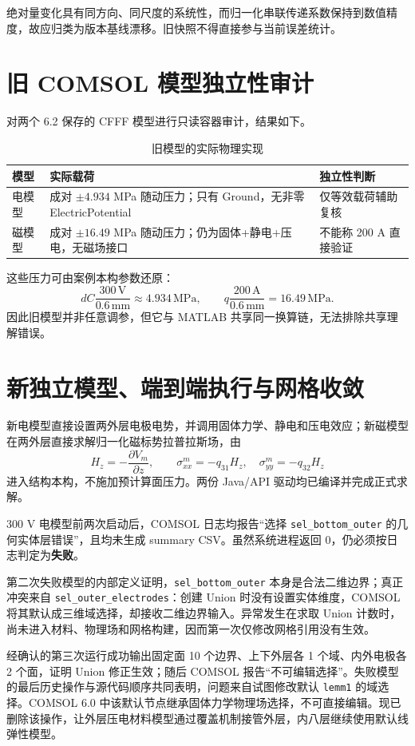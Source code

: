 \documentclass[UTF8,fontset=windows,11pt,a4paper]{ctexart}
\newcommand{\failure}{\textcolor{bad}{\textbf{失败}}}
\begin{document}
绝对量变化具有同方向、同尺度的系统性，而归一化串联传递系数保持到数值精度，故应归类为版本基线漂移。旧快照不得直接参与当前误差统计。

\section{旧 COMSOL 模型独立性审计}
对两个 6.2 保存的 CFFF 模型进行只读容器审计，结果如下。

\begin{table}[H]
\centering
\caption{旧模型的实际物理实现}
\small
\begin{tabularx}{\textwidth}{lXX}
\toprule
模型 & 实际载荷 & 独立性判断 \\
\midrule
电模型 & 成对 $\pm4.934$ MPa 随动压力；只有 Ground，无非零 ElectricPotential & 仅等效载荷辅助复核 \\
磁模型 & 成对 $\pm16.49$ MPa 随动压力；仍为固体+静电+压电，无磁场接口 & 不能称 200 A 直接验证 \\
\bottomrule
\end{tabularx}
\end{table}

这些压力可由案例本构参数还原：
\[
dC\frac{300\,\mathrm{V}}{0.6\,\mathrm{mm}}\approx4.934\,\mathrm{MPa},\qquad
q\frac{200\,\mathrm{A}}{0.6\,\mathrm{mm}}=16.49\,\mathrm{MPa}.
\]
因此旧模型并非任意调参，但它与 MATLAB 共享同一换算链，无法排除共享理解错误。

\section{新独立模型、端到端执行与网格收敛}
新电模型直接设置两外层电极电势，并调用固体力学、静电和压电效应；新磁模型在两外层直接求解归一化磁标势拉普拉斯场，由
\[
H_z=-\frac{\partial V_m}{\partial z},\qquad
\sigma^{m}_{xx}=-q_{31}H_z,\quad \sigma^{m}_{yy}=-q_{32}H_z
\]
进入结构本构，不施加预计算面压力。两份 Java/API 驱动均已编译并完成正式求解。

300 V 电模型前两次启动后，COMSOL 日志均报告“选择 \texttt{sel\_bottom\_outer} 的几何实体层错误”，且均未生成 summary CSV。虽然系统进程返回 0，仍必须按日志判定为\failure。

第二次失败模型的内部定义证明，\texttt{sel\_bottom\_outer} 本身是合法二维边界；真正冲突来自 \texttt{sel\_outer\_electrodes}：创建 Union 时没有设置实体维度，COMSOL 将其默认成三维域选择，却接收二维边界输入。异常发生在求取 Union 计数时，尚未进入材料、物理场和网格构建，因而第一次仅修改网格引用没有生效。

经确认的第三次运行成功输出固定面 10 个边界、上下外层各 1 个域、内外电极各 2 个面，证明 Union 修正生效；随后 COMSOL 报告“不可编辑选择”。失败模型的最后历史操作与源代码顺序共同表明，问题来自试图修改默认 \texttt{lemm1} 的域选择。COMSOL 6.0 中该默认节点继承固体力学物理场选择，不可直接编辑。现已删除该操作，让外层压电材料模型通过覆盖机制接管外层，内八层继续使用默认线弹性模型。
\end{document}
